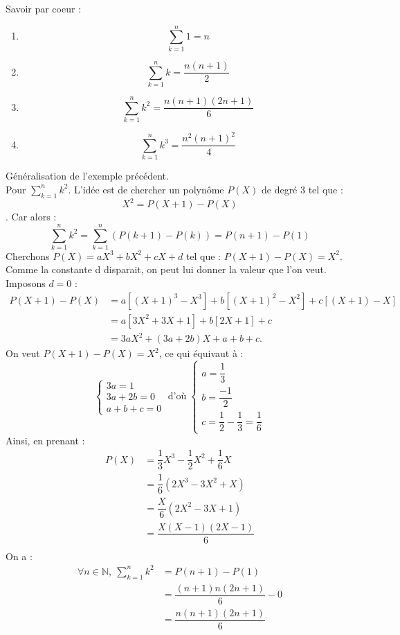 \documentclass[a4paper,11pt]{article}
\newcommand{\N}{\mathbb{N}}
\begin{document}
\begin{proposition}
	Savoir par coeur :
	\begin{enumerate}
		\item $$\sum_{k=1}^{n}1 = n$$
		\item $$\sum_{k=1}^{n}k = \dfrac{n(n+1)}{2}$$
		\item $$\sum_{k=1}^{n}k^2 = \dfrac{n(n+1)(2n+1)}{6}$$
		\item $$\sum_{k=1}^{n}k^3 = \dfrac{n^2(n+1)^2}{4}$$
	\end{enumerate}
\end{proposition}

\begin{methode}
	Généralisation de l'exemple précédent.\\
	Pour $\sum_{k=1}^{n}k^2$. L'idée est de chercher un polynôme $P(X)$ de degré 3 tel que : $$X^2 = P(X+1) - P(X)$$.
	Car alors : $$\sum_{k=1}^{n}k^2 = \sum_{k=1}^{n}(P(k+1) - P(k)) = P(n+1) - P(1)$$
	Cherchons $P(X) = aX^3 + bX^2 +cX + d$ tel que :  $P(X+1) - P(X) = X^2$. Comme la constante d disparait, on peut lui donner la valeur que l'on veut. Imposons $d=0$ :
	\begin{align*}
		P(X+1) - P(X) &= a[(X+1)^3 - X^3] + b[(X+1)^2 - X^2] + c[(X+1) - X] \\
		&= a[3X^2 + 3X + 1] + b[2X + 1] + c \\
		&= 3aX^2 + (3a + 2b)X + a + b + c.
	\end{align*}
	On veut $P(X+1) - P(X) = X^2$, ce qui équivaut à :
	$$
	\begin{cases}
		3a = 1 \\
		3a + 2b = 0 \\
		a + b + c = 0
	\end{cases}
	\; \text{d'où} \;
	\begin{cases}
		a=\dfrac{1}{3}\\
		b=\dfrac{-1}{2}\\
		c=\dfrac{1}{2} - \dfrac{1}{3} = \dfrac{1}{6}
	\end{cases}	$$
	\newpage
	Ainsi, en prenant : 
	\begin{align*}
		P(X) &= \dfrac{1}{3}X^3 - \dfrac{1}{2}X^2 + \dfrac{1}{6}X \\
		&= \dfrac{1}{6}(2X^3 - 3X^2 + X)\\
		&= \dfrac{X}{6}(2X^2 - 3X + 1)\\
		&= \dfrac{X(X-1)(2X-1)}{6}\\
	\end{align*}
	On a :
	\begin{align*}
		\forall n \in\N, \: \sum_{k=1}^{n}k^2 &= P(n+1) - P(1)\\
		&= \dfrac{(n+1)n(2n+1)}{6} - 0\\
		&= \dfrac{n(n+1)(2n+1)}{6}
	\end{align*}
	

\end{methode}
\end{document}
